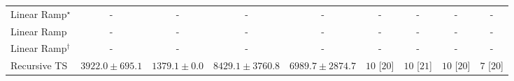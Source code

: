 \begin{tabular}{l|cccc|cccc|}
Linear Ramp$^\star$ & {\cellcolor[HTML]{000000}} \color[HTML]{F1F1F1} {\cellcolor{white}} \color{black} - & {\cellcolor[HTML]{000000}} \color[HTML]{F1F1F1} {\cellcolor{white}} \color{black} - & {\cellcolor[HTML]{000000}} \color[HTML]{F1F1F1} {\cellcolor{white}} \color{black} - & {\cellcolor[HTML]{000000}} \color[HTML]{F1F1F1} {\cellcolor{white}} \color{black} - & {\cellcolor[HTML]{000000}} \color[HTML]{F1F1F1} {\cellcolor{white}} \color{black} - & {\cellcolor[HTML]{000000}} \color[HTML]{F1F1F1} {\cellcolor{white}} \color{black} - & {\cellcolor[HTML]{000000}} \color[HTML]{F1F1F1} {\cellcolor{white}} \color{black} - & {\cellcolor[HTML]{000000}} \color[HTML]{F1F1F1} {\cellcolor{white}} \color{black} - \\
Linear Ramp & {\cellcolor[HTML]{000000}} \color[HTML]{F1F1F1} {\cellcolor{white}} \color{black} - & {\cellcolor[HTML]{000000}} \color[HTML]{F1F1F1} {\cellcolor{white}} \color{black} - & {\cellcolor[HTML]{000000}} \color[HTML]{F1F1F1} {\cellcolor{white}} \color{black} - & {\cellcolor[HTML]{000000}} \color[HTML]{F1F1F1} {\cellcolor{white}} \color{black} - & {\cellcolor[HTML]{000000}} \color[HTML]{F1F1F1} {\cellcolor{white}} \color{black} - & {\cellcolor[HTML]{000000}} \color[HTML]{F1F1F1} {\cellcolor{white}} \color{black} - & {\cellcolor[HTML]{000000}} \color[HTML]{F1F1F1} {\cellcolor{white}} \color{black} - & {\cellcolor[HTML]{000000}} \color[HTML]{F1F1F1} {\cellcolor{white}} \color{black} - \\
Linear Ramp$^\dagger$ & {\cellcolor[HTML]{000000}} \color[HTML]{F1F1F1} {\cellcolor{white}} \color{black} - & {\cellcolor[HTML]{000000}} \color[HTML]{F1F1F1} {\cellcolor{white}} \color{black} - & {\cellcolor[HTML]{000000}} \color[HTML]{F1F1F1} {\cellcolor{white}} \color{black} - & {\cellcolor[HTML]{000000}} \color[HTML]{F1F1F1} {\cellcolor{white}} \color{black} - & {\cellcolor[HTML]{000000}} \color[HTML]{F1F1F1} {\cellcolor{white}} \color{black} - & {\cellcolor[HTML]{000000}} \color[HTML]{F1F1F1} {\cellcolor{white}} \color{black} - & {\cellcolor[HTML]{000000}} \color[HTML]{F1F1F1} {\cellcolor{white}} \color{black} - & {\cellcolor[HTML]{000000}} \color[HTML]{F1F1F1} {\cellcolor{white}} \color{black} - \\
Recursive TS & {\cellcolor[HTML]{9CB9D9}} \color[HTML]{000000} $3922.0\pm 695.1$ & {\cellcolor[HTML]{F6EFF7}} \color[HTML]{000000} $1379.1\pm 0.0$ & {\cellcolor[HTML]{023858}} \color[HTML]{F1F1F1} $8429.1\pm 3760.8$ & {\cellcolor[HTML]{0566A0}} \color[HTML]{F1F1F1} $6989.7\pm 2874.7$ & {\cellcolor[HTML]{49006A}} \color[HTML]{F1F1F1} $10$ [$20$] & {\cellcolor[HTML]{49006A}} \color[HTML]{F1F1F1} $10$ [$21$] & {\cellcolor[HTML]{49006A}} \color[HTML]{F1F1F1} $10$ [$20$] & {\cellcolor[HTML]{CD238F}} \color[HTML]{F1F1F1} $7$ [$20$] \\

\end{tabular}
